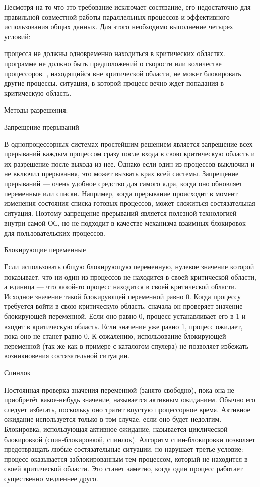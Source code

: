 \documentclass[a4paper,12pt]{extarticle}
\begin{document}
Несмотря на то что это требование исключает состязание, его недостаточно для правильной совместной работы параллельных процессов и эффективного использования общих данных. Для этого необходимо выполнение четырех условий:
\begin{itemize}
 процесса не должны одновременно находиться в критических областях.
 программе не должно быть предположений о скорости или количестве процессоров.
, находящийся вне критической области, не может блокировать другие процессы.
 ситуация, в которой процесс вечно ждет попадания в критическую область.
\end{itemize}
Методы разрешения:

Запрещение прерываний

В однопроцессорных системах простейшим решением является запрещение всех прерываний каждым процессом сразу после входа в свою критическую область и их разрешение после выхода из нее. Однако если один из процессов выключил и не включил прерывания, это может вызвать крах всей системы. Запрещение прерываний --- очень удобное средство для самого ядра, когда оно обновляет переменные или списки. Например, когда прерывание происходит в момент изменения состояния списка готовых процессов, может сложиться состязательная ситуация. Поэтому запрещение прерываний является полезной технологией внутри самой ОС, но не подходит в качестве механизма взаимных блокировок для пользовательских процессов.

Блокирующие переменные

Если использовать общую блокирующую переменную, нулевое значение которой показывает, что ни один из процессов не находится в своей критической области, а единица — что какой-то процесс находится в своей критической области. Исходное значение такой блокирующей переменной равно 0. Когда процессу требуется войти в свою критическую область, сначала он проверяет значение блокирующей переменной. Если оно равно 0, процесс устанавливает его в 1 и входит в критическую область. Если значение уже равно 1, процесс ожидает, пока оно не станет равно 0. К сожалению, использование блокирующей переменной (так же как в примере с каталогом спулера) не позволяет избежать возникновения состязательной ситуации.

Спинлок

Постоянная проверка значения переменной (занято-свободно), пока она не приобретёт какое-нибудь значение, называется активным ожиданием. Обычно его следует избегать, поскольку оно тратит впустую процессорное время. Активное ожидание используется только в том случае, если оно будет недолгим. Блокировка, использующая активное ожидание,  называется циклической блокировкой (спин-блокировкой, спинлок). Алгоритм спин-блокировки позволяет предотвращать любые состязательные ситуации, но нарушает третье условие: процесс оказывается заблокированным тем процессом, который не находится в своей критической области. Это станет заметно, когда один процесс работает существенно медленнее друго.
\end{document}
